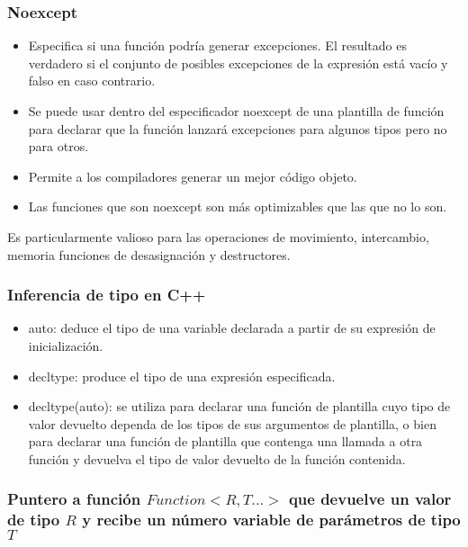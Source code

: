 \documentclass{beamer}
\begin{document}
	\begin{frame}
		\frametitle{Noexcept}
		\begin{itemize}
			\item Especifica si una función podría generar excepciones. El resultado es verdadero si el conjunto de posibles excepciones de la expresión está vacío y falso en caso contrario.
			
			\item  Se puede usar dentro del especificador noexcept de una plantilla de función para declarar que la función lanzará excepciones para algunos tipos pero no para otros.
			
			\item Permite a los compiladores generar un mejor código objeto.
			
			\item Las funciones que son noexcept son más optimizables que las que no lo son.
		\end{itemize}

		Es particularmente valioso para las operaciones de movimiento, intercambio, memoria funciones de desasignación y destructores.
	\end{frame}

	\begin{frame}
		\frametitle{Inferencia de tipo en C++}
		\begin{itemize}
			\item auto: deduce el tipo de una variable declarada a partir de su expresión de inicialización.
			\item decltype: produce el tipo de una expresión especificada.
			\item decltype(auto): se utiliza para declarar una función de plantilla cuyo tipo de valor devuelto dependa de los tipos de sus argumentos de plantilla, o bien para declarar una función de plantilla que contenga una llamada a otra función y devuelva el tipo de valor devuelto de la función contenida.
		\end{itemize}
	\end{frame}

	\begin{frame}
		\frametitle{Puntero a función $ Function<R, T...> $ que devuelve un valor de tipo $ R $ y recibe un número variable de parámetros de tipo $ T $}
		
	\end{frame}
\end{document}
